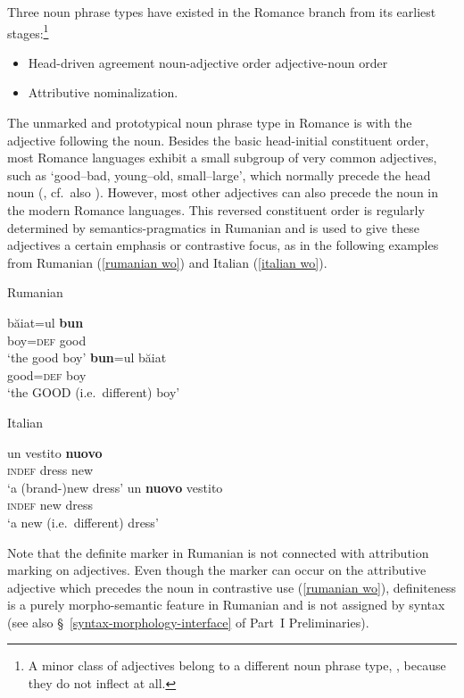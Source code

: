 Three noun phrase types have existed in the Romance branch from its earliest stages:\footnote{A minor class of adjectives belong to a different noun phrase type, 
, because they do not inflect at all.}
\begin{itemize}
\item Head\hyp{}driven agreement
	\subitem noun-adjective order
	\subitem adjective-noun order
\item Attributive nominalization.
\end{itemize}
The unmarked and prototypical noun phrase type in Romance is  with the adjective following the noun. Besides the basic head-initial constituent order, most Romance languages exhibit a small subgroup of very common adjectives, such as ‘good–bad, young–old, small–large’, which normally precede the head noun (\citealt[146–147]{posner1996}, cf.~also \citealt[340]{silvestri1998}). However, most other adjectives can also precede the noun in the modern Romance languages. This reversed constituent order is regularly determined by semantics-pragmatics in Rumanian and is used to give these adjectives a certain emphasis or contrastive focus, as in the following examples from Rumanian (\ref{rumanian wo}) and Italian (\ref{italian wo}).
\begin{exe}
\ex
\begin{xlist} 
\label{rumanian wo} 
\ex \rm{Rumanian \citep{beyer-etal1987}}\\
\begin{xlist}
\ex	
\gll	băiat=ul \textbf{bun}\\
	boy=\textsc{def} good\\
\glt	‘the good boy’
\ex	
\gll	\textbf{bun}=ul băiat\\
	good=\textsc{def} boy\\
\glt	‘the GOOD (i.e.~different) boy’ 
\end{xlist}
\label{italian wo}
\ex \rm{Italian \citep[146]{posner1996}}
\begin{xlist}
\ex	
\gll	un vestito \textbf{nuovo}\\
	\textsc{indef} dress new\\
\glt	‘a (brand-)new dress’
\ex	
\gll	un \textbf{nuovo} vestito\\
	\textsc{indef} new dress\\
\glt	‘a new (i.e.~different) dress’
\end{xlist}
\end{xlist}
\end{exe}
Note that the definite marker in Rumanian is not connected with attribution marking on adjectives. Even though the marker can occur on the attributive adjective which precedes the noun in contrastive use (\ref{rumanian wo}), definiteness is a purely morpho-semantic feature in Rumanian and is not assigned by syntax (see also \S~\ref{syntax-morphology-interface} of Part~I Preliminaries).

